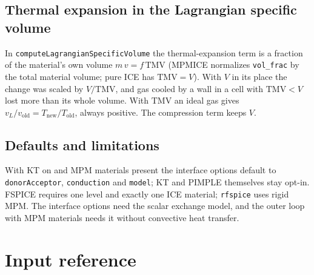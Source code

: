 \documentclass[11pt]{article}
\newcommand{\code}[1]{\texttt{\small #1}}
\begin{document}
\subsection{Thermal expansion in the Lagrangian specific volume}\label{sec:tmv}

In \code{computeLagrangianSpecificVolume} the thermal-expansion term is a fraction of the
material's own volume $m\,v = f\,\mathrm{TMV}$ (MPMICE normalizes \code{vol\_frac} by the total
material volume; pure ICE has $\mathrm{TMV}=V$). With $V$ in its place the change was scaled by
$V/\mathrm{TMV}$, and gas cooled by a wall in a cell with $\mathrm{TMV}<V$ lost more than its
whole volume. With $\mathrm{TMV}$ an ideal gas gives $v_L/v_\text{old}=T_\text{new}/T_\text{old}$,
always positive. The compression term keeps $V$.

\subsection{Defaults and limitations}

With KT on and MPM materials present the interface options default to \code{donorAcceptor},
\code{conduction} and \code{model}; KT and PIMPLE themselves stay opt-in. FSPICE requires one
level and exactly one ICE material; \code{rfspice} uses rigid MPM. The interface options need
the scalar exchange model, and the outer loop with MPM materials needs it without convective
heat transfer.

\clearpage
\section{Input reference}
\end{document}
